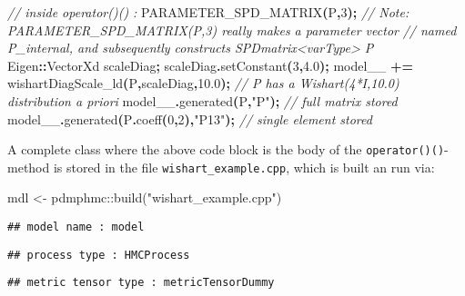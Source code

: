 \documentclass[
]{book}
\newenvironment{Shaded}{\begin{snugshade}}{\end{snugshade}}
\newcommand{\CommentTok}[1]{\textcolor[rgb]{0.56,0.35,0.01}{\textit{#1}}}
\newcommand{\DecValTok}[1]{\textcolor[rgb]{0.00,0.00,0.81}{#1}}
\newcommand{\FloatTok}[1]{\textcolor[rgb]{0.00,0.00,0.81}{#1}}
\newcommand{\FunctionTok}[1]{\textcolor[rgb]{0.00,0.00,0.00}{#1}}
\newcommand{\NormalTok}[1]{#1}
\newcommand{\OperatorTok}[1]{\textcolor[rgb]{0.81,0.36,0.00}{\textbf{#1}}}
\newcommand{\OtherTok}[1]{\textcolor[rgb]{0.56,0.35,0.01}{#1}}
\newcommand{\SpecialCharTok}[1]{\textcolor[rgb]{0.00,0.00,0.00}{#1}}
\newcommand{\StringTok}[1]{\textcolor[rgb]{0.31,0.60,0.02}{#1}}
\begin{document}
\begin{Shaded}
\begin{Highlighting}[]
\CommentTok{// inside operator()() : }
\NormalTok{PARAMETER\_SPD\_MATRIX}\OperatorTok{(}\NormalTok{P}\OperatorTok{,}\DecValTok{3}\OperatorTok{);} 
\CommentTok{// Note: PARAMETER\_SPD\_MATRIX(P,3) really makes a parameter vector  }
\CommentTok{// named P\_internal, and subsequently constructs SPDmatrix\textless{}varType\textgreater{} P}
\NormalTok{Eigen}\OperatorTok{::}\NormalTok{VectorXd scaleDiag}\OperatorTok{;}\NormalTok{ scaleDiag}\OperatorTok{.}\NormalTok{setConstant}\OperatorTok{(}\DecValTok{3}\OperatorTok{,}\FloatTok{4.0}\OperatorTok{);}
\NormalTok{model\_\_ }\OperatorTok{+=}\NormalTok{ wishartDiagScale\_ld}\OperatorTok{(}\NormalTok{P}\OperatorTok{,}\NormalTok{scaleDiag}\OperatorTok{,}\FloatTok{10.0}\OperatorTok{);} 
\CommentTok{// P has a Wishart(4*I,10.0) distribution a priori }
\NormalTok{model\_\_}\OperatorTok{.}\NormalTok{generated}\OperatorTok{(}\NormalTok{P}\OperatorTok{,}\StringTok{"P"}\OperatorTok{);} \CommentTok{// full matrix stored}
\NormalTok{model\_\_}\OperatorTok{.}\NormalTok{generated}\OperatorTok{(}\NormalTok{P}\OperatorTok{.}\NormalTok{coeff}\OperatorTok{(}\DecValTok{0}\OperatorTok{,}\DecValTok{2}\OperatorTok{),}\StringTok{"P13"}\OperatorTok{);} \CommentTok{// single element stored}
\end{Highlighting}
\end{Shaded}

A complete class where the above code block is the body of the \texttt{operator()()}-method is stored in the file \texttt{wishart\_example.cpp}, which is built an run via:

\begin{Shaded}
\begin{Highlighting}[]
\NormalTok{mdl }\OtherTok{\textless{}{-}}\NormalTok{ pdmphmc}\SpecialCharTok{::}\FunctionTok{build}\NormalTok{(}\StringTok{"wishart\_example.cpp"}\NormalTok{)}
\end{Highlighting}
\end{Shaded}

\begin{verbatim}
## model name : model
\end{verbatim}

\begin{verbatim}
## process type : HMCProcess
\end{verbatim}

\begin{verbatim}
## metric tensor type : metricTensorDummy
\end{verbatim}
\end{document}
